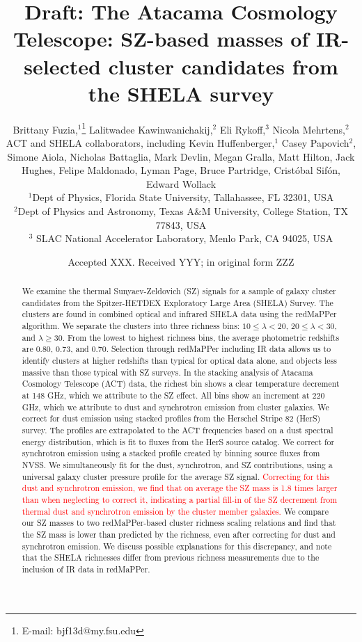 \documentclass[a4paper,fleqn,usenatbib]{mnras}
\title[SZ effect in SHELA cluster candidates]{Draft: The Atacama Cosmology Telescope: SZ-based masses of IR-selected cluster candidates from the SHELA survey}
\author[B. Fuzia et al.]{
Brittany Fuzia,$^{1}$\thanks{E-mail: bjf13d@my.fsu.edu}
Lalitwadee Kawinwanichakij,$^{2}$
Eli Rykoff,$^{3}$
Nicola Mehrtens,$^{2}$
\newauthor ACT and SHELA collaborators, 
including
Kevin Huffenberger,$^1$ 
Casey Papovich$^{2}$, 
\newauthor Simone Aiola, Nicholas Battaglia, Mark Devlin, Megan Gralla, Matt Hilton, Jack Hughes,  
\newauthor Felipe Maldonado, Lyman Page, Bruce Partridge, Crist\'obal Sif\'on, Edward Wollack
\\
$^{1}$Dept of Physics, Florida State University, Tallahassee, FL 32301, USA\\
$^{2}$Dept of Physics and Astronomy, Texas A\&M University, College Station, TX 77843, USA\\
$^{3}$ SLAC National Accelerator Laboratory, Menlo Park, CA 94025, USA\\
}
\date{Accepted XXX. Received YYY; in original form ZZZ}
\newcommand{\revisit}{\textcolor{red}}
\begin{document}
\label{firstpage}
\pagerange{\pageref{firstpage}--\pageref{lastpage}}
\maketitle

\begin{abstract}
We examine the thermal Sunyaev-Zeldovich (SZ) signals for a sample of galaxy cluster candidates from the Spitzer-HETDEX Exploratory Large Area (SHELA) Survey. 
The clusters are found in combined optical and infrared SHELA data using the redMaPPer algorithm. 
We separate the clusters into three richness bins: $10 \leq \lambda < 20$, $20 \leq \lambda < 30$, and $\lambda \geq 30$.
From the lowest to highest richness bins, the average photometric redshifts are 0.80, 0.73, and 0.70. 
Selection through redMaPPer including IR data allows us to identify clusters at higher redshifts than typical for optical data alone, and objects less massive than those typical with SZ surveys. 
In the stacking analysis of Atacama Cosmology Telescope (ACT) data, the richest bin shows a clear temperature decrement at 148 GHz, which we attribute to the SZ effect.  
All bins show an increment at 220 GHz, which we attribute to dust and synchrotron emission from cluster galaxies. 
We correct for dust emission using stacked profiles from the Herschel Stripe 82 (HerS) survey.
The profiles are extrapolated to the ACT frequencies based on a dust spectral energy distribution, which is fit to fluxes from the HerS source catalog.
We correct for synchrotron emission using a stacked profile created by binning source fluxes from NVSS.
We simultaneously fit for the dust, synchrotron, and SZ contributions, using a universal galaxy cluster pressure profile for the average SZ signal.
\revisit{Correcting for this dust and synchrotron emission, we find that on average the SZ mass is 1.8 times larger than when neglecting to correct it, indicating a partial fill-in of the SZ decrement from thermal dust and synchrotron emission by the cluster member galaxies. }
We compare our SZ masses to two redMaPPer-based cluster richness scaling relations and find that the SZ mass is lower than predicted by the richness, even after correcting for dust and synchrotron emission. 
We discuss possible explanations for this discrepancy, and note that the SHELA richnesses differ from previous richness measurements due to the inclusion of IR data in redMaPPer.


\end{abstract}
\end{document}
